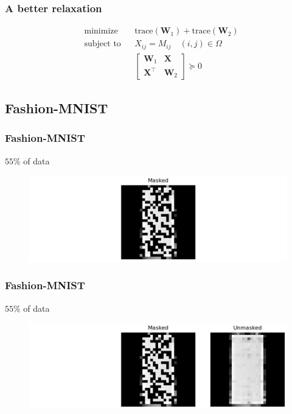 \documentclass[
	11pt, %
]{beamer}
\begin{document}
\begin{frame}
	\frametitle{A better relaxation}

	\begin{equation*}
		\begin{aligned}
		& {\text{minimize}}
		& & \text{trace}(\mathbf{W}_1) + \text{trace}(\mathbf{W}_2) \\[1pt]
		& \text{subject to}
		& & X_{ij} = M_{ij} \quad (i,j) \in \Omega\\[1pt]
		&&& \begin{bmatrix} 
		  \mathbf{W}_1 & \mathbf{X} \\
		  \mathbf{X}^\top & \mathbf{W}_2
		\end{bmatrix} \succeq 0 
		\end{aligned}
	  \end{equation*}	
\end{frame}

\subsection{Fashion-MNIST} 

\begin{frame}
	\frametitle{Fashion-MNIST}
	$55 \%$ of data
	\begin{figure}
		\centering
		\includegraphics[scale=.3]{assets/mc_ex1_masked.jpeg}
	\end{figure}
\end{frame}

\begin{frame}
	\frametitle{Fashion-MNIST}
	$55 \%$ of data
	\begin{figure}
		\centering
		\includegraphics[scale=.3]{assets/mc_ex1_unmasked.jpeg}
	\end{figure}
\end{frame}
\end{document}
